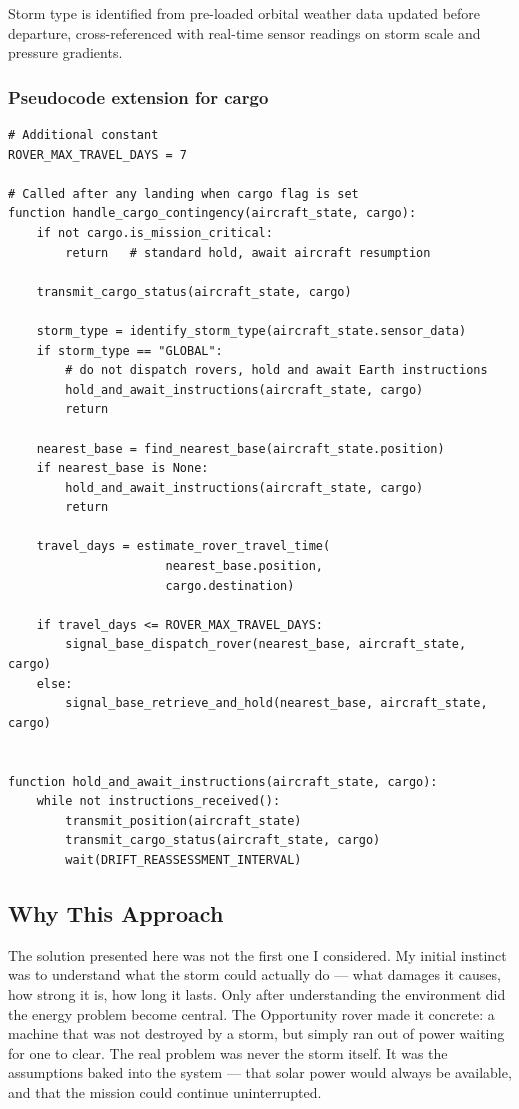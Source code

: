 \documentclass[a4paper,12pt]{article}
\begin{document}
Storm type is identified from pre-loaded orbital weather data updated before departure,
cross-referenced with real-time sensor readings on storm scale and pressure gradients.

\subsubsection*{Pseudocode extension for cargo}
\begin{verbatim}
# Additional constant
ROVER_MAX_TRAVEL_DAYS = 7

# Called after any landing when cargo flag is set
function handle_cargo_contingency(aircraft_state, cargo):
    if not cargo.is_mission_critical:
        return   # standard hold, await aircraft resumption

    transmit_cargo_status(aircraft_state, cargo)

    storm_type = identify_storm_type(aircraft_state.sensor_data)
    if storm_type == "GLOBAL":
        # do not dispatch rovers, hold and await Earth instructions
        hold_and_await_instructions(aircraft_state, cargo)
        return

    nearest_base = find_nearest_base(aircraft_state.position)
    if nearest_base is None:
        hold_and_await_instructions(aircraft_state, cargo)
        return

    travel_days = estimate_rover_travel_time(
                      nearest_base.position,
                      cargo.destination)

    if travel_days <= ROVER_MAX_TRAVEL_DAYS:
        signal_base_dispatch_rover(nearest_base, aircraft_state, cargo)
    else:
        signal_base_retrieve_and_hold(nearest_base, aircraft_state, cargo)


function hold_and_await_instructions(aircraft_state, cargo):
    while not instructions_received():
        transmit_position(aircraft_state)
        transmit_cargo_status(aircraft_state, cargo)
        wait(DRIFT_REASSESSMENT_INTERVAL)
\end{verbatim}

\subsection{Why This Approach}
The solution presented here was not the first one I considered. My initial instinct was to
understand what the storm could actually do — what damages it causes, how strong it is, how
long it lasts. Only after understanding the environment did the energy problem become central.
The Opportunity rover made it concrete: a machine that was not destroyed by a storm, but simply
ran out of power waiting for one to clear. The real problem was never the storm itself. It was
the assumptions baked into the system — that solar power would always be available, and that
the mission could continue uninterrupted.
\end{document}
